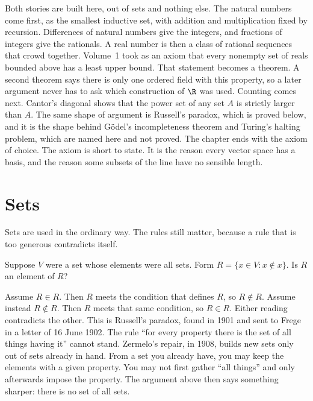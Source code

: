 Both stories are built here, out of sets and nothing else. The natural numbers come first, as the smallest inductive set, with addition and multiplication fixed by recursion. Differences of natural numbers give the integers, and fractions of integers give the rationals. A real number is then a class of rational sequences that crowd together. Volume~1 took as an axiom that every nonempty set of reals bounded above has a least upper bound. That statement becomes a theorem. A second theorem says there is only one ordered field with this property, so a later argument never has to ask which construction of $\R$ was used. Counting comes next. Cantor's diagonal shows that the power set of any set $A$ is strictly larger than $A$. The same shape of argument is Russell's paradox, which is proved below, and it is the shape behind G\"odel's incompleteness theorem and Turing's halting problem, which are named here and not proved. The chapter ends with the axiom of choice. The axiom is short to state. It is the reason every vector space has a basis, and the reason some subsets of the line have no sensible length.

\section{Sets}

Sets are used in the ordinary way. The rules still matter, because a rule that is too generous contradicts itself.

\begin{think}
Suppose $V$ were a set whose elements were all sets. Form $R=\{x\in V:x\notin x\}$. Is $R$ an element of $R$?
\end{think}

Assume $R\in R$. Then $R$ meets the condition that defines $R$, so $R\notin R$. Assume instead $R\notin R$. Then $R$ meets that same condition, so $R\in R$. Either reading contradicts the other. This is Russell's paradox, found in 1901 and sent to Frege in a letter of 16 June 1902. The rule ``for every property there is the set of all things having it'' cannot stand. Zermelo's repair, in 1908, builds new sets only out of sets already in hand. From a set you already have, you may keep the elements with a given property. You may not first gather ``all things'' and only afterwards impose the property. The argument above then says something sharper: there is no set of all sets.

